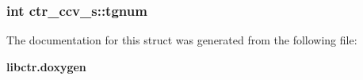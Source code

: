 \subsubsection{\setlength{\rightskip}{0pt plus 5cm}int \bf{ctr\_\-ccv\_\-s::tgnum}}\label{structctr__ccv__s_6cfa8a2b9f43817869ba3899612f978c}




The documentation for this struct was generated from the following file:\begin{CompactItemize}
\item 
\bf{libctr.doxygen}\end{CompactItemize}
